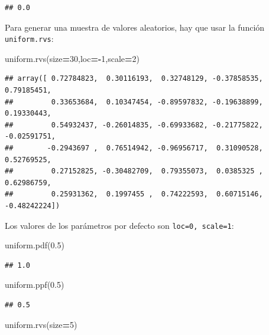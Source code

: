 \documentclass[]{book}
\newenvironment{Shaded}{\begin{snugshade}}{\end{snugshade}}
\newcommand{\DecValTok}[1]{\textcolor[rgb]{0.00,0.00,0.81}{#1}}
\newcommand{\FloatTok}[1]{\textcolor[rgb]{0.00,0.00,0.81}{#1}}
\newcommand{\NormalTok}[1]{#1}
\newcommand{\OperatorTok}[1]{\textcolor[rgb]{0.81,0.36,0.00}{\textbf{#1}}}
\begin{document}
\begin{verbatim}
## 0.0
\end{verbatim}

Para generar una muestra de valores aleatorios, hay que usar la función \texttt{uniform.rvs}:

\begin{Shaded}
\begin{Highlighting}[]
\NormalTok{uniform.rvs(size}\OperatorTok{=}\DecValTok{30}\NormalTok{,loc}\OperatorTok{=-}\DecValTok{1}\NormalTok{,scale}\OperatorTok{=}\DecValTok{2}\NormalTok{)}
\end{Highlighting}
\end{Shaded}

\begin{verbatim}
## array([ 0.72784823,  0.30116193,  0.32748129, -0.37858535,  0.79185451,
##         0.33653684,  0.10347454, -0.89597832, -0.19638899,  0.19330443,
##         0.54932437, -0.26014835, -0.69933682, -0.21775822, -0.02591751,
##        -0.2943697 ,  0.76514942, -0.96956717,  0.31090528,  0.52769525,
##         0.27152825, -0.30482709,  0.79355073,  0.0385325 ,  0.62986759,
##         0.25931362,  0.1997455 ,  0.74222593,  0.60715146, -0.48242224])
\end{verbatim}

Los valores de los parámetros por defecto son \texttt{loc=0,\ scale=1}:

\begin{Shaded}
\begin{Highlighting}[]
\NormalTok{uniform.pdf(}\FloatTok{0.5}\NormalTok{)}
\end{Highlighting}
\end{Shaded}

\begin{verbatim}
## 1.0
\end{verbatim}

\begin{Shaded}
\begin{Highlighting}[]
\NormalTok{uniform.ppf(}\FloatTok{0.5}\NormalTok{)}
\end{Highlighting}
\end{Shaded}

\begin{verbatim}
## 0.5
\end{verbatim}

\begin{Shaded}
\begin{Highlighting}[]
\NormalTok{uniform.rvs(size}\OperatorTok{=}\DecValTok{5}\NormalTok{)}
\end{Highlighting}
\end{Shaded}
\end{document}
